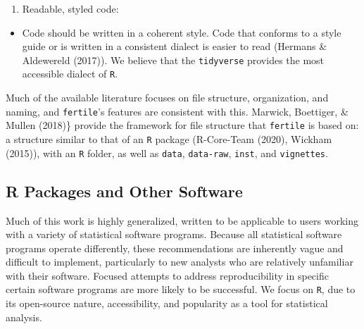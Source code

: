 \documentclass[12pt,twoside]{reedthesis}
\providecommand{\tightlist}{%
  \setlength{\itemsep}{0pt}\setlength{\parskip}{0pt}}
\begin{document}
\begin{enumerate}
\def\labelenumi{\arabic{enumi}.}
\setcounter{enumi}{4}
\tightlist
\item
  Readable, styled code:
\end{enumerate}
\begin{itemize}
\tightlist
\item
  Code should be written in a coherent style. Code that conforms to a
  style guide or is written in a consistent dialect is easier to read
  (Hermans \& Aldewereld (2017)). We believe that the \texttt{tidyverse}
  provides the most accessible dialect of \texttt{R}.
\end{itemize}
Much of the available literature focuses on file structure,
organization, and naming, and \texttt{fertile}'s features are consistent
with this. Marwick, Boettiger, \& Mullen (2018)\} provide the framework
for file structure that \texttt{fertile} is based on: a structure
similar to that of an \texttt{R} package (R-Core-Team (2020), Wickham
(2015)), with an \texttt{R} folder, as well as \texttt{data},
\texttt{data-raw}, \texttt{inst}, and \texttt{vignettes}.

\subsection{R Packages and Other
Software}\label{r-packages-and-other-software}

Much of this work is highly generalized, written to be applicable to
users working with a variety of statistical software programs. Because
all statistical software programs operate differently, these
recommendations are inherently vague and difficult to implement,
particularly to new analysts who are relatively unfamiliar with their
software. Focused attempts to address reproducibility in specific
certain software programs are more likely to be successful. We focus on
\texttt{R}, due to its open-source nature, accessibility, and popularity
as a tool for statistical analysis.
\end{document}
